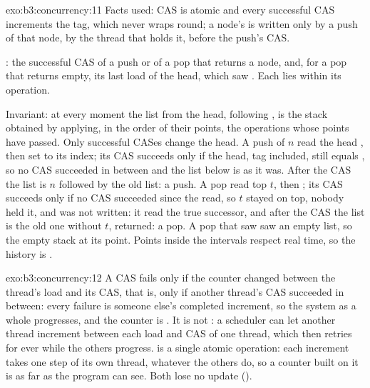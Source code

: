 \begin{solution}{exo:b3:concurrency:11}
Facts used: CAS is atomic and every successful CAS increments the tag, which never wraps round; a node's  is written only by a push of that node, by the thread that holds it, before the push's CAS.

: the successful CAS of a push or of a pop that returns a node, and, for a pop that returns empty, its last load of the head, which saw . Each lies within its operation.

Invariant: at every moment the list from the head, following , is the stack obtained by applying, in the order of their points, the operations whose points have passed. Only successful CASes change the head. A push of $n$ read the head , then set  to its index; its CAS succeeds only if the head, tag included, still equals , so no CAS succeeded in between and the list below  is as it was. After the CAS the list is $n$ followed by the old list: a push. A pop read top $t$, then ; its CAS succeeds only if no CAS succeeded since the read, so $t$ stayed on top, nobody held it, and  was not written: it read the true successor, and after the CAS the list is the old one without $t$, returned: a pop. A pop that saw  saw an empty list, so the empty stack at its point. Points inside the intervals respect real time, so the history is .
\end{solution}

\begin{solution}{exo:b3:concurrency:12}
A CAS fails only if the counter changed between the thread's load and its CAS, that is, only if another thread's CAS succeeded in between: every failure is someone else's completed increment, so the system as a whole progresses, and the counter is . It is not : a scheduler can let another thread increment between each load and CAS of one thread, which then retries for ever while the others progress.  is a single atomic operation: each increment takes one step of its own thread, whatever the others do, so a counter built on it is  as far as the program can see. Both lose no update ().
\end{solution}

